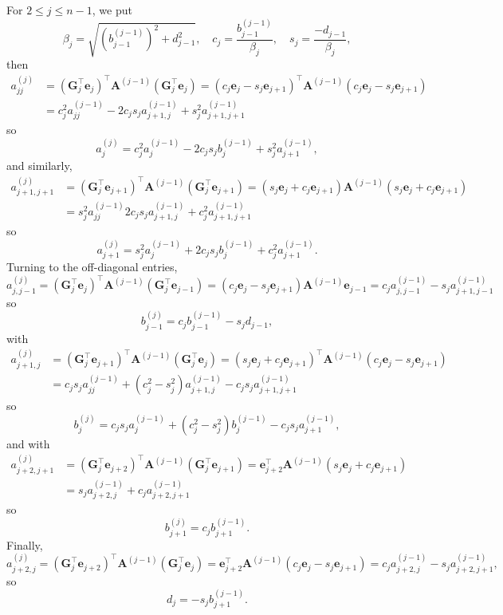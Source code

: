 \documentclass[12pt,a4paper]{article}
\newcommand{\bs}[1]{\boldsymbol{#1}}
\begin{document}
For $2\le j\le n-1$, we put
\[
\beta_j=\sqrt{(b^{(j-1)}_{j-1})^2+d_{j-1}^2},\quad
c_j=\frac{b^{(j-1)}_{j-1}}{\beta_j},\quad
s_j=\frac{-d_{j-1}}{\beta_j},
\]
then
\begin{align*}
a^{(j)}_{jj}&=(\bs{G}_j^\top\bs{e}_j)^\top\bs{A}^{(j-1)}(\bs{G}_j^\top\bs{e}_j)
	=(c_j\bs{e}_j-s_j\bs{e}_{j+1})^\top\bs{A}^{(j-1)}
		(c_j\bs{e}_j-s_j\bs{e}_{j+1})\\
	&=c_j^2a^{(j-1)}_{jj}-2c_js_ja^{(j-1)}_{j+1,j}+s_j^2a^{(j-1)}_{j+1,j+1}
\end{align*}
so
\[
a^{(j)}_j=c_j^2a^{(j-1)}_j-2c_js_jb^{(j-1)}_j+s_j^2a^{(j-1)}_{j+1},
\]
and similarly,
\begin{align*}
a^{(j)}_{j+1,j+1}&=(\bs{G}_j^\top\bs{e}_{j+1})^\top\bs{A}^{(j-1)}
	(\bs{G}_j^\top\bs{e}_{j+1})
=(s_j\bs{e}_j+c_j\bs{e}_{j+1})\bs{A}^{(j-1)}(s_j\bs{e}_j+c_j\bs{e}_{j+1})\\
	&=s_j^2a^{(j-1)}_{jj}2c_js_ja^{(j-1)}_{j+1,j}+c_j^2a^{(j-1)}_{j+1,j+1}
\end{align*}
so
\[
a^{(j)}_{j+1}=s_j^2a^{(j-1)}_j+2c_js_jb^{(j-1)}_j+c_j^2a^{(j-1)}_{j+1}.
\]
Turning to the off-diagonal entries,
\[
a^{(j)}_{j,j-1}=(\bs{G}_j^\top\bs{e}_j)^\top\bs{A}^{(j-1)}
	(\bs{G}_j^\top\bs{e}_{j-1})
	=(c_j\bs{e}_j-s_j\bs{e}_{j+1})\bs{A}^{(j-1)}\bs{e}_{j-1}
	=c_ja^{(j-1)}_{j,j-1}-s_ja^{(j-1)}_{j+1,j-1}
\]
so
\[
b^{(j)}_{j-1}=c_jb^{(j-1)}_{j-1}-s_jd_{j-1},
\]
with
\begin{align*}
a^{(j)}_{j+1,j}&=(\bs{G}_j^\top\bs{e}_{j+1})^\top\bs{A}^{(j-1)}
	(\bs{G}_j^\top\bs{e}_j)
	=(s_j\bs{e}_j+c_j\bs{e}_{j+1})^\top\bs{A}^{(j-1)}
	(c_j\bs{e}_j-s_j\bs{e}_{j+1})\\
	&=c_js_ja^{(j-1)}_{jj}+(c_j^2-s_j^2)a^{(j-1)}_{j+1,j}
		-c_js_ja^{(j-1)}_{j+1,j+1}
\end{align*}
so
\[
b^{(j)}_j=c_js_ja^{(j-1)}_j+(c_j^2-s_j^2)b^{(j-1)}_j
	-c_js_ja^{(j-1)}_{j+1},
\]
and with
\begin{align*}
a^{(j)}_{j+2,j+1}&=(\bs{G}_j^\top\bs{e}_{j+2})^\top\bs{A}^{(j-1)}
	(\bs{G}_j^\top\bs{e}_{j+1})
	=\bs{e}_{j+2}^\top\bs{A}^{(j-1)}(s_j\bs{e}_j+c_j\bs{e}_{j+1})\\
	&=s_ja^{(j-1)}_{j+2,j}+c_ja^{(j-1)}_{j+2,j+1}
\end{align*}
so
\[
b^{(j)}_{j+1}=c_jb^{(j-1)}_{j+1}.
\]
Finally,
\[
a^{(j)}_{j+2,j}=(\bs{G}_j^\top\bs{e}_{j+2})^\top\bs{A}^{(j-1)}
	(\bs{G}_j^\top\bs{e}_j)
	=\bs{e}_{j+2}^\top\bs{A}^{(j-1)}(c_j\bs{e}_j-s_j\bs{e}_{j+1})
	=c_ja^{(j-1)}_{j+2,j}-s_ja^{(j-1)}_{j+2,j+1},
\]
so
\[
d_j=-s_jb^{(j-1)}_{j+1}.
\]
\end{document}
